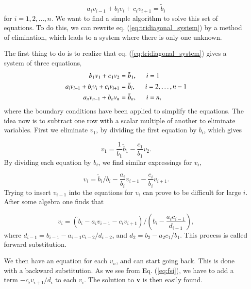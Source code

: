 \documentclass{article}
\begin{document}
\begin{multicols}{2}
\begin{equation}\label{eq:tridiagonal_system}
  a_iv_{i-1}+b_iv_i+c_iv_{i+1} = \tilde{b}_i
\end{equation}
for $i=1,2,\dots,n$. We want to find a simple algorithm to solve this set of equations. To do this, we can rewrite eq. (\ref{eq:tridiagonal_system}) by a method of elimination, which leads to a system where there is only one unknown. 

The first thing to do is to realize that eq. (\ref{eq:tridiagonal_system}) gives a system of three equations,
\begin{align}
	b_1 v_1 + c_1 v_2 &= \tilde{b}_1, \hspace{0.5cm} i = 1  \\
	a_i v_{i-1} + b_i v_i + c_i v_{i+1} &= \tilde{b}_i, \hspace{0.5cm} i = 2, \dots, n - 1 \\
	a_n v_{n-1} + b_n v_n &= \tilde{b}_n, \hspace{0.5cm} i = n  ,
\end{align}
where the boundary conditions have been applied to simplify the equations. The idea now is to subtract one row with a scalar multiple of another to eliminate variables. First we eliminate $v_1$, by dividing the first equation by $b_i$, which gives

\begin{equation}
	v_1 = \frac{1}{b_1}\tilde{b}_1 - \frac{c_1}{b_1}v_2.
\end{equation}
By dividing each equation by $b_i$, we find similar expressings for $v_i$,

\begin{equation}
	v_i = \tilde{b}_i/b_i - \frac{a_i}{b_i}v_{i-1} - \frac{c_i}{b_i}v_{i+1}.
\end{equation}
Trying to insert $v_{i-1}$ into the equations for $v_i$ can prove to be difficult for large $i$. After some algebra one finds that

\begin{equation}\label{eq:fsi}
	v_i = \left( \tilde{b}_i - a_iv_{i-1} - c_iv_{i+1} \right)/\left( b_i - \frac{a_ic_{i-1}}{d_{i-1}} \right),
\end{equation}
where $d_{i-1} =  b_{i-1} - a_{i-1}c_{i-2}/d_{i-2}$, and $d_{2} = b_2 - a_2c_1/b_1$. This process is called forward substitution.

We then have an equation for each $v_n$, and can start going back. This is done with a backward substitution. As we see from Eq. (\ref{eq:fsi}), we have to add a term $-c_iv_{i+1}/d_i$ to each $v_i$. The solution to \textbf{v} is then easily found.




\end{multicols}
\end{document}
